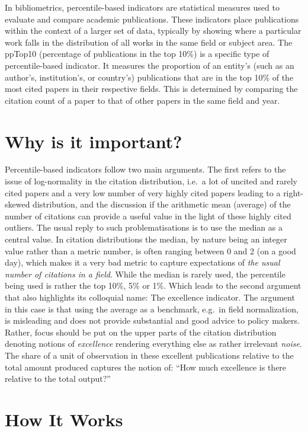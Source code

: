 \documentclass[
  letterpaper,
]{scrreprt}
\begin{document}
In bibliometrics, percentile-based indicators are statistical measures
used to evaluate and compare academic publications. These indicators
place publications within the context of a larger set of data, typically
by showing where a particular work falls in the distribution of all
works in the same field or subject area. The ppTop10 (percentage of
publications in the top 10\%) is a specific type of percentile-based
indicator. It measures the proportion of an entity's (such as an
author's, institution's, or country's) publications that are in the top
10\% of the most cited papers in their respective fields. This is
determined by comparing the citation count of a paper to that of other
papers in the same field and year.

\section{Why is it important?}\label{why-is-it-important-8}

Percentile-based indicators follow two main arguments. The first refers
to the issue of log-normality in the citation distribution, i.e.~a lot
of uncited and rarely cited papers and a very low number of very highly
cited papers leading to a right-skewed distribution, and the discussion
if the arithmetic mean (average) of the number of citations can provide
a useful value in the light of these highly cited outliers. The usual
reply to such problematisations is to use the median as a central value.
In citation distributions the median, by nature being an integer value
rather than a metric number, is often ranging between 0 and 2 (on a good
day), which makes it a very bad metric to capture expectations of
\emph{the usual number of citations in a field}. While the median is
rarely used, the percentile being used is rather the top 10\%, 5\% or
1\%. Which leads to the second argument that also highlights its
colloquial name: The excellence indicator. The argument in this case is
that using the average as a benchmark, e.g.~in field normalization, is
misleading and does not provide substantial and good advice to policy
makers. Rather, focus should be put on the upper parts of the citation
distribution denoting notions of \emph{excellence} rendering everything
else as rather irrelevant \emph{noise}. The share of a unit of
observation in these excellent publications relative to the total amount
produced captures the notion of: ``How much excellence is there relative
to the total output?''

\section{How It Works}\label{how-it-works}
\end{document}
